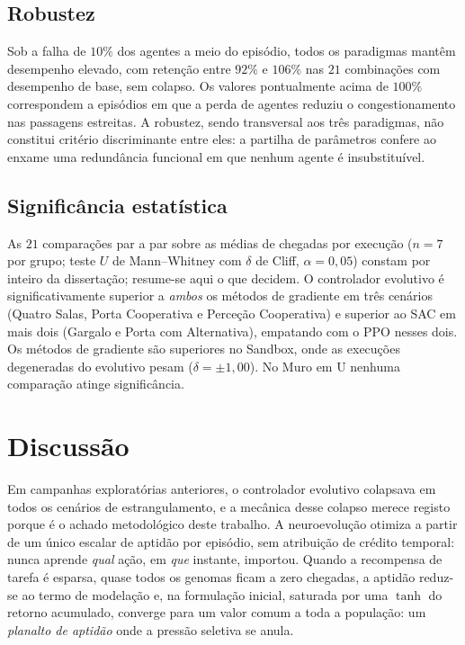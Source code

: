 \documentclass[final,5p,times,twocolumn,authoryear]{elsarticle}
\begin{document}
\subsection{Robustez}
 Sob a falha de $10\%$ dos agentes a meio do episódio, todos os paradigmas mantêm
desempenho elevado, com retenção entre $92\%$ e $106\%$ nas $21$ combinações com
desempenho de base, sem colapso. Os valores pontualmente acima de $100\%$
correspondem a episódios em que a perda de agentes reduziu o congestionamento nas
passagens estreitas. A robustez, sendo transversal aos três paradigmas, não
constitui critério discriminante entre eles: a partilha de parâmetros confere
ao enxame uma redundância funcional em que nenhum
agente é insubstituível.

\subsection{Significância estatística}
 As $21$ comparações par a par sobre as médias de chegadas por execução
($n=7$ por grupo; teste $U$ de Mann--Whitney com $\delta$ de Cliff,
$\alpha=0{,}05$) constam por inteiro da dissertação; resume-se aqui o que
decidem. O controlador evolutivo é
significativamente superior a \emph{ambos} os métodos de gradiente em três
cenários (Quatro Salas, Porta Cooperativa e Perceção Cooperativa) e superior ao
SAC em mais dois (Gargalo e Porta com Alternativa), empatando com o PPO nesses
dois. Os métodos de gradiente são superiores no Sandbox, onde as execuções
degeneradas do evolutivo pesam ($\delta=\pm1{,}00$). No Muro em U nenhuma
comparação atinge significância.


\section{Discussão}
\label{sec:discussion}
 Em campanhas exploratórias anteriores, o controlador evolutivo colapsava em todos
os cenários de estrangulamento, e a mecânica desse colapso merece registo porque
é o achado metodológico deste trabalho. A neuroevolução otimiza a partir de um
único escalar de aptidão por episódio, sem atribuição de crédito temporal: nunca
aprende \emph{qual} ação, em \emph{que} instante, importou. Quando a recompensa de
tarefa é esparsa, quase todos os genomas ficam a zero chegadas, a aptidão reduz-se ao
termo de modelação e, na formulação inicial, saturada por uma $\tanh$ do
retorno acumulado, converge para um valor comum a toda a população: um
\emph{planalto de aptidão} onde a pressão seletiva se anula.
\end{document}
